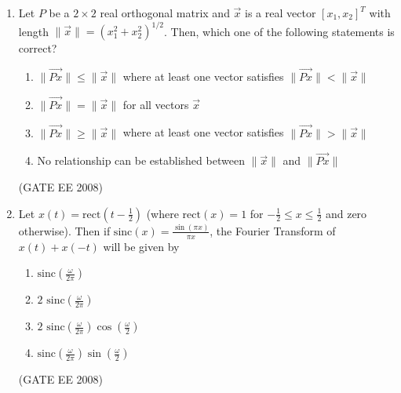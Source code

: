 \documentclass[journal,12pt,onecolumn]{IEEEtran}
\theoremstyle{remark}
\begin{document}
\begin{enumerate}[start=1, label=Q.\arabic*]
\begin{multicols}{4}
\begin{enumerate}
    \item $0.00099$
    \item $0.00495$
    \item $0.0099$
    \item $0.0198$
\end{enumerate}
\end{multicols}
\hfill (GATE EE 2008)

\item Let $P$ be a $2\times 2$ real orthogonal matrix and $\vec{x}$ is a real vector $[x_1, x_2]^T$ with length $\|\vec{x}\| = (x_1^2+x_2^2)^{1/2}$. Then, which one of the following statements is correct?

\begin{enumerate}
    \item $\|\vec{Px}\| \le \|\vec{x}\|$ where at least one vector satisfies $\|\vec{Px}\| < \|\vec{x}\|$
    \item $\|\vec{Px}\| = \|\vec{x}\|$ for all vectors $\vec{x}$
    \item $\|\vec{Px}\| \ge \|\vec{x}\|$ where at least one vector satisfies $\|\vec{Px}\| > \|\vec{x}\|$
    \item No relationship can be established between $\|\vec{x}\|$ and $\|\vec{Px}\|$
\end{enumerate}
\hfill (GATE EE 2008)


\item Let $x(t) = \text{rect}\left(t-\frac{1}{2}\right)$ (where $\text{rect}(x)=1$ for $-\frac{1}{2} \le x \le \frac{1}{2}$ and zero otherwise). Then if $\text{sinc}(x)=\frac{\sin(\pi x)}{\pi x}$, the Fourier Transform of $x(t)+x(-t)$ will be given by

\begin{multicols}{2}
\begin{enumerate}
    \item $\text{sinc}\left(\frac{\omega}{2\pi}\right)$
    \item $2 \text{ sinc}\left(\frac{\omega}{2\pi}\right)$
    \item $2 \text{ sinc}\left(\frac{\omega}{2\pi}\right)\cos\left(\frac{\omega}{2}\right)$
    \item $\text{sinc}\left(\frac{\omega}{2\pi}\right)\sin\left(\frac{\omega}{2}\right)$
\end{enumerate}
\end{multicols}
\hfill (GATE EE 2008)


\end{enumerate}
\end{document}
